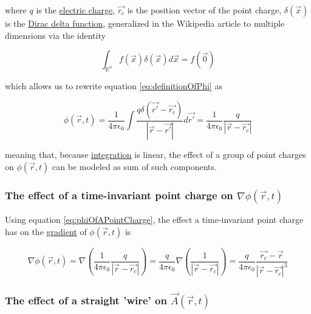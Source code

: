 ﻿\documentclass{article}
\begin{document}
where $q$ is the \href{https://en.wikipedia.org/wiki/Electric_charge}{electric charge}, $\vec{r_c}$ is the position vector of the point charge, $\delta(\vec{x})$ is the \href{https://en.wikipedia.org/wiki/Dirac_delta_function}{Dirac delta function}, generalized in the Wikipedia article to 
multiple dimensions via the identity

\begin{equation}
    \label{eq:DiracDeltaIdentityInMultipleDimensions}
    \int_{\mathbb{R}^n} f(\vec{x}) \delta(\vec{x}) d\vec{x} = f(\vec{0})
\end{equation}

which allows us to rewrite equation \ref{eq:definitionOfPhi} as

\begin{equation}
    \label{eq:phiOfAPointCharge}
    \phi(\vec{r}, t) = \frac{1}{4 \pi \epsilon_0} \int \frac{q \delta(\vec{r'} - \vec{r_c})}{|\vec{r} - \vec{r'}|} d \vec{r'} = \frac{1}{4 \pi \epsilon_0} \frac{q}{|\vec{r} - \vec{r_c}|}
\end{equation}

meaning that, because \href{https://en.wikipedia.org/wiki/Integral}{integration} is linear, the effect of a group of point charges on $\phi(\vec{r}, t)$ can be modeled as sum of such components.

\subsubsection{The effect of a time-invariant point charge on $\nabla \phi(\vec{r}, t)$}

Using equation \ref{eq:phiOfAPointCharge}, the effect a time-invariant point charge has on the \href{https://en.wikipedia.org/wiki/Gradient}{gradient} of $\phi(\vec{r}, t)$ is

\begin{equation}
    \label{eq:gradientOfPhiOfAPointCharge}
    \nabla \phi(\vec{r}, t) = \nabla \left( \frac{1}{4 \pi \epsilon_0} \frac{q}{|\vec{r} - \vec{r_c}|} \right) = \frac{q}{4 \pi \epsilon_0} \nabla \left( \frac{1}{|\vec{r} - \vec{r_c}|} \right) = \frac{q}{4 \pi \epsilon_0} \frac{\vec{r_c} - \vec{r}}{|\vec{r} - \vec{r_c}|^3}
\end{equation}

\subsubsection{The effect of a straight 'wire' on $\vec{A}(\vec{r}, t)$}
\end{document}
